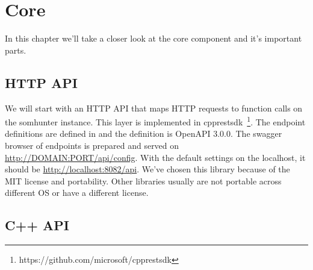 \chapter{Core}
\label{comp-core}

In this chapter we'll take a closer look at the core component and it's important parts.

\section{HTTP API}

We will start with an HTTP API that maps HTTP requests to function calls on the somhunter instance. This layer is implemented in cpprestsdk~\footnote{https://github.com/microsoft/cpprestsdk}. The endpoint definitions are defined in  and the definition is OpenAPI 3.0.0. The swagger browser of endpoints is prepared and served on \url{http://DOMAIN:PORT/api/config}. With the default settings on the localhost, it should be \url{http://localhost:8082/api}. We've chosen this library because of the MIT license and portability. Other libraries usually are not portable across different OS or have a different license.

\section{C++ API}

